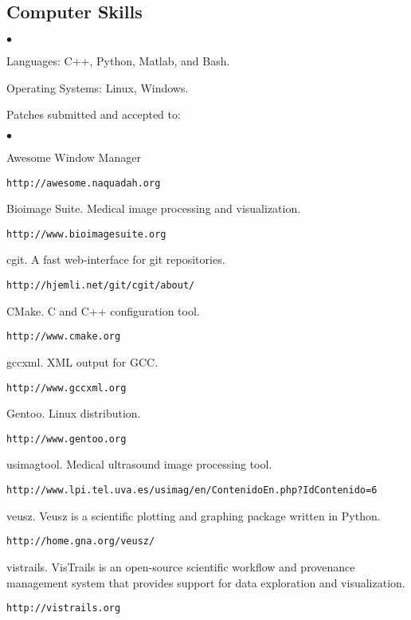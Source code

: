 \documentclass[margin,line]{res}
\newenvironment{list2}{
  \begin{list}{$\bullet$}{%
      \setlength{\itemsep}{0in}
      \setlength{\parsep}{0in} \setlength{\parskip}{0in}
      \setlength{\topsep}{0in} \setlength{\partopsep}{0in} 
      \setlength{\leftmargin}{0.2in}}}{\end{list}}
\begin{document}
\begin{resume}
% 
\section{\sc Computer Skills} 
\begin{list2}
\item Languages:  C++, Python, Matlab, and Bash.
\item Operating Systems:  Linux, Windows.\\ 
\end{list2}
\vspace*{-.15in}  

Patches submitted and accepted to:
\begin{list2}
\item Awesome Window Manager
  \begin{verbatim}http://awesome.naquadah.org\end{verbatim}
\item Bioimage Suite.  Medical image processing and visualization.
  \begin{verbatim}http://www.bioimagesuite.org\end{verbatim}
\item cgit. A fast web-interface for git repositories. \begin{verbatim}http://hjemli.net/git/cgit/about/\end{verbatim}
\item CMake.  C and C++ configuration tool. \begin{verbatim}http://www.cmake.org\end{verbatim}
\item gccxml.  XML output for GCC.
  \begin{verbatim}http://www.gccxml.org\end{verbatim}
\item Gentoo.  Linux distribution.
  \begin{verbatim}http://www.gentoo.org\end{verbatim}
\item usimagtool.  Medical ultrasound image processing tool.
  \begin{verbatim}http://www.lpi.tel.uva.es/usimag/en/ContenidoEn.php?IdContenido=6\end{verbatim}
\item veusz.  Veusz is a scientific plotting and graphing package written in
  Python.  \begin{verbatim}http://home.gna.org/veusz/\end{verbatim}
\item vistrails.  VisTrails is an open-source scientific workflow and provenance
  management system that provides support for data exploration and visualization.
  \begin{verbatim}http://vistrails.org\end{verbatim}
\end{list2}


\end{resume}
\end{document}

